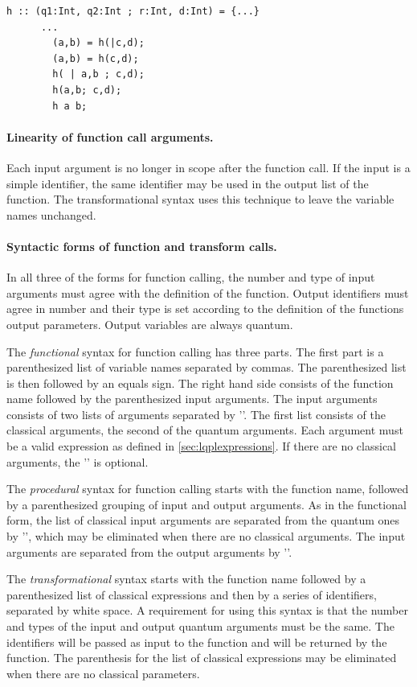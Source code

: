 \begin{lstlisting}[style=linqpl]
      h :: (q1:Int, q2:Int ; r:Int, d:Int) = {...}
      ...
        (a,b) = h(|c,d);
        (a,b) = h(c,d);
        h( | a,b ; c,d);
        h(a,b; c,d);
        h a b;
\end{lstlisting}



\paragraph{Linearity of function call arguments.}
Each input argument is no longer in scope after the function call. If 
the input is a simple identifier, the same identifier may be used in
the output list of the function. The transformational
syntax uses this technique to leave the variable names unchanged.

\paragraph{Syntactic forms of function and transform calls.}
In all three of the forms for function calling, the number and type
of input arguments must agree with the definition of the function.
Output identifiers must agree in number and their type is set according
to the definition of the functions output parameters. Output
variables are always quantum.

The  \emph{functional} syntax for function calling has three parts.
The first part is a parenthesized  list of variable names separated by 
commas.
The parenthesized list is then followed by an equals sign. The right hand side
 consists of the function name
followed by the  parenthesized  input arguments. The input arguments 
consists of two lists of arguments separated by '\inlqpl{|}'. The first
list consists of the classical arguments, the second of the quantum arguments.
Each argument must be a valid expression as defined 
in  \vref{sec:lqplexpressions}.
 If there are no classical arguments, the '\inlqpl{|}' is optional.


The  \emph{procedural} syntax for function calling starts with the
function name, followed by a parenthesized grouping of input and
output arguments.  As in the functional form, the list of classical input 
arguments are separated from the quantum ones by '\inlqpl{|}', which may
be eliminated when there are no classical arguments. The input arguments
are separated from the output arguments by '\inlqpl{;}'. 

The \emph{transformational} syntax starts with the
function name followed  by a parenthesized list of classical
expressions and then by a series of identifiers, separated by white space.
A requirement for using this syntax is that the
number and types of the input and output quantum arguments must be the same. 
The identifiers will be passed as input to the function and will be
returned by the function. The parenthesis for the list of classical
expressions may be eliminated when there are no classical parameters.


